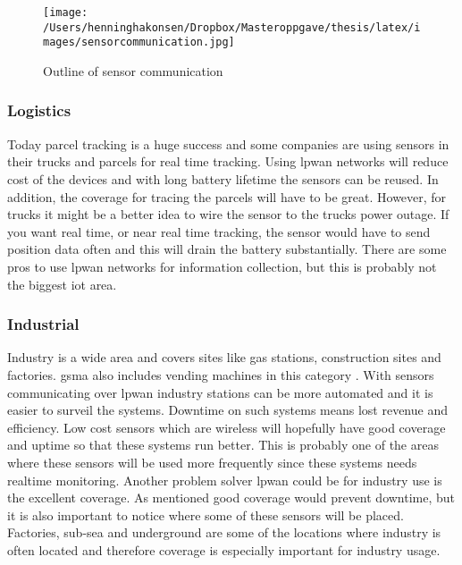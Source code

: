 \documentclass[USenglish]{ifimaster}  %
\begin{document}
\begin{figure}[H]
  \centering\texttt{[image: /Users/henninghakonsen/Dropbox/Masteroppgave/thesis/latex/images/sensorcommunication.jpg]}
  \caption{Outline of sensor communication \cite{person:ola}}
  \label{pic:sensorcommunication}
\end{figure}

\subsubsection{Logistics}
Today parcel tracking is a huge success and some companies are using sensors in their trucks and parcels for real time tracking. Using \acrshort{lpwan} networks will reduce cost of the devices and with long battery lifetime the sensors can be reused. In addition, the coverage for tracing the parcels will have to be great. However, for trucks it might be a better idea to wire the sensor to the trucks power outage. If you want real time, or near real time tracking, the sensor would have to send position data often and this will drain the battery substantially. There are some pros to use \acrshort{lpwan} networks for information collection, but this is probably not the biggest \acrshort{iot} area.

\subsubsection{Industrial}
Industry is a wide area and covers sites like gas stations, construction sites and factories. \acrshort{gsma} also includes vending machines in this category \cite{online:lpwaFuture}. With sensors communicating over \acrshort{lpwan} industry stations can be more automated and it is easier to surveil the systems. Downtime on such systems means lost revenue and efficiency. Low cost sensors which are wireless will hopefully have good coverage and uptime so that these systems run better. This is probably one of the areas where these sensors will be used more frequently since these systems needs realtime monitoring. Another problem solver \acrshort{lpwan} could be for industry use is the excellent coverage. As mentioned good coverage would prevent downtime, but it is also important to notice where some of these sensors will be placed. Factories, sub-sea and underground are some of the locations where industry is often located and therefore coverage is especially important for industry usage.
\end{document}
